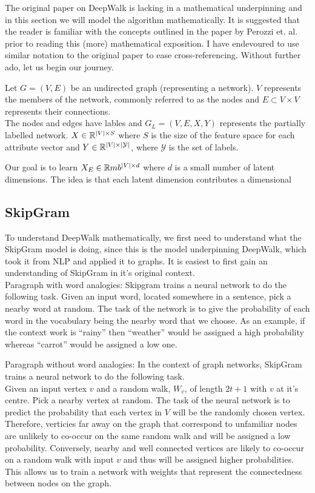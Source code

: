 \documentclass[a4paper]{article}
\begin{document}
The original paper on DeepWalk is lacking in a mathematical underpinning and in
this section we will model the algorithm mathematically. It is suggested that the reader
is familiar with the concepts outlined in the paper by Perozzi et. al. prior to
reading this (more) mathematical exposition. I have endevoured to use similar
notation to the original paper to ease cross-referencing. Without further ado, let us begin
our journey.

\begin{definition}
  Let $G = (V, E)$ be an undirected graph (representing a network). $V$ represents the
  members of the network, commonly referred to as the nodes and $E \subset V
  \times V$ represents their connections.\\

  The nodes and edges have lables and $G_L = (V, E, X, Y)$ represents the
  partially labelled network. $X \in \R^{|V| \times S}$ where $S$ is the size of
  the feature space for each attribute vector and $Y \in \R^{|V| \times
    |\mathcal{Y}|}$, where $\mathcal{Y}$ is the set of labels.
\end{definition}

Our goal is to learn $X_E \in \R mb^{|V| \times d}$ where $d$ is a small number
of latent dimensions. The idea is that each latent dimension contributes a 
dimensional

\subsection{SkipGram}
To understand DeepWalk mathematically, we first need to understand what the SkipGram
model is doing, since this is the model underpinning DeepWalk, which took it
from NLP and applied it to graphs. It is easiest to first gain an understanding
of SkipGram in it's original context.\\

Paragraph with word analogies:
Skipgram trains a neural network to do the following task. Given an input word,
located somewhere in a sentence, pick a nearby word at random. The task of the
network is to give the probability of each word in the vocabulary being the
nearby word that we choose. As an example, if the context work is ``rainy'' then
``weather'' would be assigned a high probability whereas ``carrot'' would be
assigned a low one.

Paragraph without word analogies:
In the context of graph networks, SkipGram trains a neural network to do the
following task.\\
Given an input vertex $v$ and a random walk, $W_{v}$, of length $2t+1$ with $v$
at it's centre. Pick a nearby vertex at random. The task of the neural network is to
predict the probability that each vertex in $V$ will be the randomly chosen
vertex. Therefore, verticies far away on the graph that correspond to unfamiliar
nodes are unlikely to co-occur on the same random walk and will be assigned a
low probability. Conversely, nearby and well connected vertices are likely to
co-occur on a random walk with input $v$ and thus will be assigned higher
probabilities. This allows us to train a network with weights that represent the
connectedness between nodes on the graph.
\end{document}
